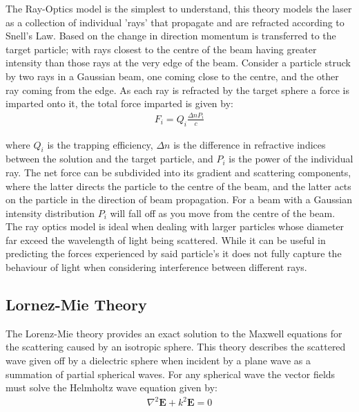 The Ray-Optics model is the simplest to understand, this theory models 
the laser as a collection of individual 'rays' that propagate and are 
refracted according to Snell's Law. Based on the change in direction 
momentum is transferred to the target particle; with rays closest to 
the centre of the beam having greater intensity than those rays at 
the very edge of the beam. Consider a particle struck by two rays in 
a Gaussian beam, one coming close to the centre, and the other ray 
coming from the edge. As each ray is refracted by the target sphere a 
force is imparted onto it, the total force imparted is given by:
\begin{align}
	F_i = Q_i\frac{\Delta n P_i}{c}
\end{align}

where $Q_i$ is the trapping efficiency, $\Delta n$ is the difference
in refractive indices between the solution and the target particle,
and $P_i$ is the power of the individual ray. The net force can be 
subdivided into its gradient and scattering components, where the latter
directs the particle to the centre of the beam, and the latter acts on 
the particle in the direction of beam propagation. For a beam with a
Gaussian intensity distribution $P_i$ will fall off as you move from
the centre of the beam. The ray optics model is ideal when dealing 
with larger particles whose diameter far exceed the wavelength of light
being scattered. While it can be useful in predicting the forces 
experienced by said particle's it does not fully capture the behaviour
of light when considering interference between different rays.


\subsection{Lornez-Mie Theory}

The Lorenz-Mie theory provides an exact solution to the Maxwell 
equations for the scattering caused by an isotropic sphere. This 
theory describes the scattered wave given off by a dielectric 
sphere when incident by a plane wave as a summation of partial 
spherical waves. For any spherical wave the vector fields must 
solve the Helmholtz wave equation given by:
\begin{align}
	\nabla^2\mathbf{E} +k^2\mathbf{E} = 0
\end{align} 

